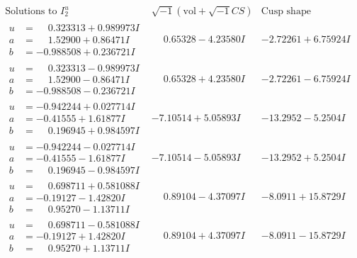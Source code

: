 \documentclass[1p]{elsarticle_modified}
\theoremstyle{definition}
\newcommand{\I}{\sqrt{-1}}
\begin{document}
$$\begin{array}{c|c|c}  
\text{Solutions to }I^u_{2}& \I (\text{vol} + \sqrt{-1}CS) & \text{Cusp shape}\\
 \hline 
\begin{aligned}
u &= \phantom{-}0.323313 + 0.989973 I \\
a &= \phantom{-}1.52900 + 0.86471 I \\
b &= -0.988508 + 0.236721 I\end{aligned}
 & \phantom{-}0.65328 - 4.23580 I & -2.72261 + 6.75924 I \\ \hline\begin{aligned}
u &= \phantom{-}0.323313 - 0.989973 I \\
a &= \phantom{-}1.52900 - 0.86471 I \\
b &= -0.988508 - 0.236721 I\end{aligned}
 & \phantom{-}0.65328 + 4.23580 I & -2.72261 - 6.75924 I \\ \hline\begin{aligned}
u &= -0.942244 + 0.027714 I \\
a &= -0.41555 + 1.61877 I \\
b &= \phantom{-}0.196945 + 0.984597 I\end{aligned}
 & -7.10514 + 5.05893 I & -13.2952 - 5.2504 I \\ \hline\begin{aligned}
u &= -0.942244 - 0.027714 I \\
a &= -0.41555 - 1.61877 I \\
b &= \phantom{-}0.196945 - 0.984597 I\end{aligned}
 & -7.10514 - 5.05893 I & -13.2952 + 5.2504 I \\ \hline\begin{aligned}
u &= \phantom{-}0.698711 + 0.581088 I \\
a &= -0.19127 - 1.42820 I \\
b &= \phantom{-}0.95270 - 1.13711 I\end{aligned}
 & \phantom{-}0.89104 - 4.37097 I & -8.0911 + 15.8729 I \\ \hline\begin{aligned}
u &= \phantom{-}0.698711 - 0.581088 I \\
a &= -0.19127 + 1.42820 I \\
b &= \phantom{-}0.95270 + 1.13711 I\end{aligned}
 & \phantom{-}0.89104 + 4.37097 I & -8.0911 - 15.8729 I \\ \hline\begin{aligned}

\end{aligned}
\end{array}$$
\end{document}
